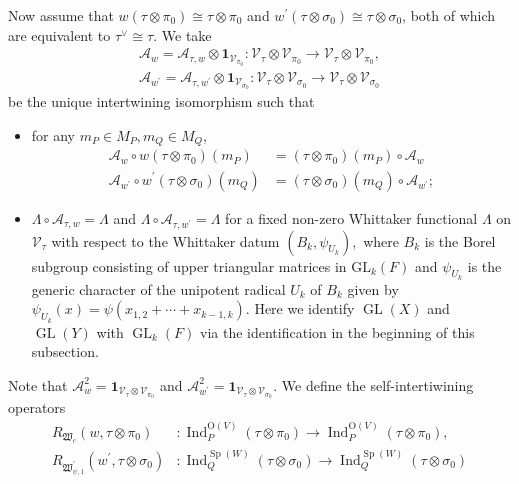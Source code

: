 \documentclass[article]{article}
\numberwithin{equation}{section}
\theoremstyle{definition}
\DeclareMathOperator{\Ind}{Ind}
\DeclareMathOperator{\GL}{GL}
\DeclareMathOperator{\SP}{Sp}
\begin{document}
Now assume that $w(\tau \otimes \pi_0)\cong \tau\otimes \pi_0$ and $w^\prime(\tau \otimes \sigma_0)\cong \tau\otimes \sigma_0$, both of which are equivalent to $\tau^\vee \cong \tau$. We take  
\begin{align*}
\mathcal{A}_{w}=\mathcal A_{\tau,w}\otimes\mathbf 1_{\mathscr V_{\pi_0}} : \mathscr{V}_{\tau} \otimes \mathscr{V}_{\pi_0} \rightarrow \mathscr{V}_{\tau} \otimes \mathscr{V}_{\pi_0},\\
\mathcal{A}_{w^\prime}=\mathcal A_{\tau,w^\prime}\otimes\mathbf 1_{\mathscr V_{\sigma_0}} : \mathscr{V}_{\tau} \otimes \mathscr{V}_{\sigma_0} \rightarrow \mathscr{V}_{\tau} \otimes \mathscr{V}_{\sigma_0}
\end{align*}
be the unique intertwining isomorphism such that 
\begin{itemize}
	\item for any $m_P \in M_{P}, m_Q\in M_Q$, 
	\begin{align*}
	\mathcal{A}_{w} \circ w(\tau \otimes \pi_0)(m_P)&=(\tau \otimes \pi_0)(m_P) \circ \mathcal{A}_{w}\\ 
	\mathcal{A}_{w^\prime} \circ w^\prime(\tau \otimes \sigma_0)(m_Q)&=(\tau \otimes \sigma_0)(m_Q) \circ \mathcal{A}_{w^\prime};
	\end{align*}
\item $\Lambda \circ \mathcal{A}_{\tau,w}=\Lambda$ and $\Lambda \circ \mathcal{A}_{\tau,w^\prime}=\Lambda$ for a fixed  non-zero Whittaker functional $\Lambda$ on $\mathscr V_{\tau}$ with respect to the Whittaker datum $\left(B_{k}, \psi_{U_{k}}\right),$ where $B_{k}$ is the Borel subgroup consisting of upper triangular matrices in $\mathrm{GL}_{k}(F)$ and $\psi_{U_{k}}$ is the generic character of the unipotent radical $U_{k}$ of $B_{k}$ given by $\psi_{U_{k}}(x)=\psi\left(x_{1,2}+\cdots+x_{k-1, k}\right)$. Here we identify $\GL(X)$ and $\GL(Y)$ with $\GL_k(F)$ via the identification in the beginning of this subsection. 
\end{itemize}
Note that $\mathcal{A}_{w}^2=\mathbf 1_{\mathscr V_{\tau}\otimes \mathscr V_{\pi_0}}$ and $\mathcal{A}_{w^\prime}^2=\mathbf 1_{\mathscr V_{\tau}\otimes \mathscr V_{\sigma_0}}$. We define the self-intertiwining operators 
\begin{align*}
R_{\mathfrak W_{c}}(w, \tau \otimes \pi_0) &: \Ind_{P}^{\mathrm{O}(V)}(\tau\otimes \pi_0)\rightarrow  \Ind_{P}^{\mathrm{O}(V)}(\tau \otimes \pi_0),\\
R_{\mathfrak W^\prime_{\psi,1}}(w^{\prime}, \tau \otimes \sigma_0) &: \Ind_{Q}^{\SP(W)}(\tau \otimes \sigma_0) \rightarrow \Ind_{Q}^{\SP(W)}(\tau \otimes \sigma_0)
\end{align*}
\end{document}
